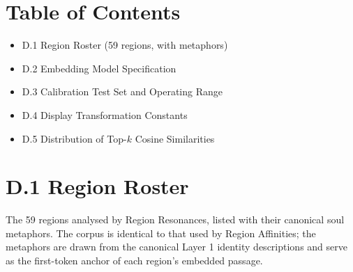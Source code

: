 \documentclass[11pt]{article}
\begin{document}

\section*{Table of Contents}
\begin{itemize}[leftmargin=2em,itemsep=0.1em,topsep=0.1em]
\item D.1 Region Roster (59 regions, with metaphors)
\item D.2 Embedding Model Specification
\item D.3 Calibration Test Set and Operating Range
\item D.4 Display Transformation Constants
\item D.5 Distribution of Top-$k$ Cosine Similarities
\end{itemize}

\section*{D.1 Region Roster}
The 59 regions analysed by Region Resonances, listed with their canonical soul metaphors. The corpus is identical to that used by Region Affinities; the metaphors are drawn from the canonical Layer 1 identity descriptions and serve as the first-token anchor of each region's embedded passage.
\end{document}
